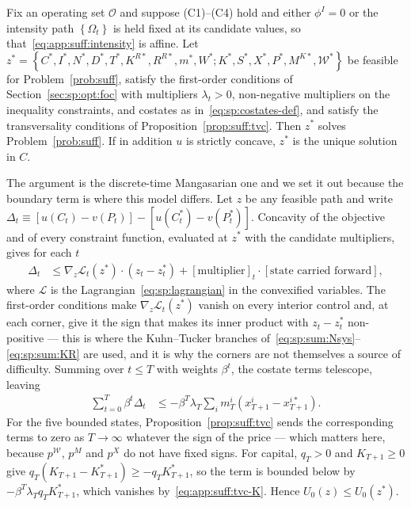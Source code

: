 \begin{theorem}\label{thm:suff}
Fix an operating set $\mathcal O$ and suppose (C1)--(C4) hold and either $\phi^I=0$ or the intensity path $\left\{\Omega_t\right\}$ is held fixed at its candidate values, so that~\eqref{eq:app:suff:intensity} is affine. Let $z^*=\left\{C^*,I^*,N^*,D^*,T^*,K^{R*},R^{R*},m^*,W^*;K^*,S^*,X^*,P^*,M^{K*},\mathcal W^*\right\}$ be feasible for Problem~\ref{prob:suff}, satisfy the first-order conditions of Section~\ref{sec:sp:opt:foc} with multipliers $\lambda_t>0$, non-negative multipliers on the inequality constraints, and costates as in~\eqref{eq:sp:costates-def}, and satisfy the transversality conditions of Proposition~\ref{prop:suff:tvc}. Then $z^*$ solves Problem~\ref{prob:suff}. If in addition $u$ is strictly concave, $z^*$ is the unique solution in $C$.
\end{theorem}

The argument is the discrete-time Mangasarian one and we set it out because the boundary term is where this model differs. Let $z$ be any feasible path and write $\Delta_t\equiv\left[u\left(C_t\right)-v\left(P_t\right)\right]-\left[u\left(C^*_t\right)-v\left(P^*_t\right)\right]$. Concavity of the objective and of every constraint function, evaluated at $z^*$ with the candidate multipliers, gives for each $t$
\begin{align}
\Delta_t &\le \nabla_z\mathcal L_t\left(z^*\right)\cdot\left(z_t-z^*_t\right)+\left[\text{multiplier}\right]_t\cdot\left[\text{state carried forward}\right],
\label{eq:app:suff:step}
\end{align}
where $\mathcal L$ is the Lagrangian~\eqref{eq:sp:lagrangian} in the convexified variables. The first-order conditions make $\nabla_z\mathcal L_t\left(z^*\right)$ vanish on every interior control and, at each corner, give it the sign that makes its inner product with $z_t-z^*_t$ non-positive --- this is where the Kuhn--Tucker branches of~\eqref{eq:sp:sum:Nsys}--\eqref{eq:sp:sum:KR} are used, and it is why the corners are not themselves a source of difficulty. Summing over $t\le T$ with weights $\beta^t$, the costate terms telescope, leaving
\begin{align}
\sum_{t=0}^{T}\beta^t\Delta_t &\le -\beta^T\lambda_T\sum_{i}m^i_T\left(x^i_{T+1}-x^{i*}_{T+1}\right).
\label{eq:app:suff:boundary}
\end{align}
For the five bounded states, Proposition~\ref{prop:suff:tvc} sends the corresponding terms to zero as $T\to\infty$ whatever the sign of the price --- which matters here, because $p^{\mathcal W}$, $p^M$ and $p^X$ do not have fixed signs. For capital, $q_T>0$ and $K_{T+1}\ge0$ give $q_T\left(K_{T+1}-K^*_{T+1}\right)\ge-q_TK^*_{T+1}$, so the term is bounded below by $-\beta^T\lambda_Tq_TK^*_{T+1}$, which vanishes by~\eqref{eq:app:suff:tvc-K}. Hence $U_0\left(z\right)\le U_0\left(z^*\right)$.

